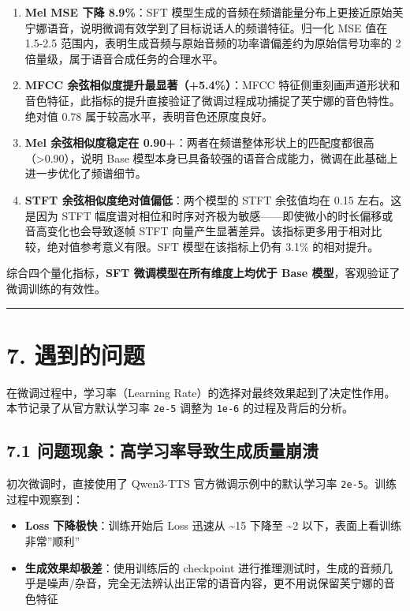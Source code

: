 \documentclass[
  english,
  letterpaper,
  DIV=11,
  numbers=noendperiod]{scrartcl}
\providecommand{\tightlist}{%
  \setlength{\itemsep}{0pt}\setlength{\parskip}{0pt}}
\begin{document}
\begin{enumerate}
\def\labelenumi{\arabic{enumi}.}
\item
  \textbf{Mel MSE 下降 8.9\%}：SFT
  模型生成的音频在频谱能量分布上更接近原始芙宁娜语音，说明微调有效学到了目标说话人的频谱特征。归一化
  MSE 值在 1.5-2.5
  范围内，表明生成音频与原始音频的功率谱偏差约为原始信号功率的 2
  倍量级，属于语音合成任务的合理水平。
\item
  \textbf{MFCC 余弦相似度提升最显著（+5.4\%）}：MFCC
  特征侧重刻画声道形状和音色特征，此指标的提升直接验证了微调过程成功捕捉了芙宁娜的音色特性。绝对值
  0.78 属于较高水平，表明音色还原度良好。
\item
  \textbf{Mel 余弦相似度稳定在
  0.90+}：两者在频谱整体形状上的匹配度都很高（\textgreater0.90），说明
  Base
  模型本身已具备较强的语音合成能力，微调在此基础上进一步优化了频谱细节。
\item
  \textbf{STFT 余弦相似度绝对值偏低}：两个模型的 STFT 余弦值均在 0.15
  左右。这是因为 STFT
  幅度谱对相位和时序对齐极为敏感------即使微小的时长偏移或音高变化也会导致逐帧
  STFT 向量产生显著差异。该指标更多用于相对比较，绝对值参考意义有限。SFT
  模型在该指标上仍有 3.1\% 的相对提升。
\end{enumerate}

综合四个量化指标，\textbf{SFT 微调模型在所有维度上均优于 Base
模型}，客观验证了微调训练的有效性。

\begin{center}\rule{0.5\linewidth}{0.5pt}\end{center}

\section{7. 遇到的问题}\label{ux9047ux5230ux7684ux95eeux9898}

在微调过程中，学习率（Learning
Rate）的选择对最终效果起到了决定性作用。本节记录了从官方默认学习率
\texttt{2e-5} 调整为 \texttt{1e-6} 的过程及背后的分析。

\subsection{7.1
问题现象：高学习率导致生成质量崩溃}\label{ux95eeux9898ux73b0ux8c61ux9ad8ux5b66ux4e60ux7387ux5bfcux81f4ux751fux6210ux8d28ux91cfux5d29ux6e83}

初次微调时，直接使用了 Qwen3-TTS 官方微调示例中的默认学习率
\texttt{2e-5}。训练过程中观察到：

\begin{itemize}
\tightlist
\item
  \textbf{Loss 下降极快}：训练开始后 Loss 迅速从 \textasciitilde15
  下降至 \textasciitilde2 以下，表面上看训练非常''顺利''
\item
  \textbf{生成效果却极差}：使用训练后的 checkpoint
  进行推理测试时，生成的音频几乎是噪声/杂音，完全无法辨认出正常的语音内容，更不用说保留芙宁娜的音色特征
\end{itemize}
\end{document}
